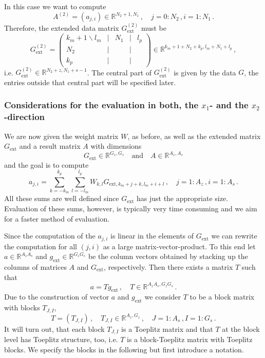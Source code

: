\documentclass[a4,12pt]{article}
\newcommand{\Real}[1]{\mathbb{R}^{#1}}
\begin{document}
In this case we want to compute
\[
A^{(2)}=(a_{j,i})\in\Real{N_2+1,N_1}\,,\quad j=0:N_2\,, i=1:N_1\,.
\]
Therefore, the extended data matrix $G_\text{ext}^{(2)}$ must be
\[
G_\text{ext}^{(2)}=
\begin{pmatrix}
k_m+1\backslash{}l_m&|&N_1&|& l_p\\\hline
N_2&|&&|&\\\hline
k_p&|&&|&
\end{pmatrix}
\in\Real{k_m+1+N_2+k_p,l_m+N_1+l_p}\,,
\]
i.e. $G_\text{ext}^{(2)}\in\Real{N_2+z,N_1+s-1}$.
The central part of $G_\text{ext}^{(2)}$ is given by the data $G$, the entries
outside that central part will be specified later.

\subsubsection*{Considerations for the evaluation in both, the $x_1$- and the 
  $x_2$-direction} 

We are now given the weight matrix $W$, as before, as well as the extended
matrix $G_\text{ext}$ and a result matrix $A$ with dimensions
\[
G_\text{ext}\in\Real{G_z,G_s}\quad\text{and}\quad
A\in\Real{A_z,A_s}
\]
and the goal is to compute
\[
a_{j,i}=\sum_{k=-k_m}^{k_p}\sum_{l=-l_m}^{l_p}W_{k,l}G_{\text{ext},k_m+j+k,l_m+i+l}\,,\quad
j=1:A_z\,, i=1:A_s\,.
\]
All these sums are well defined since $G_\text{ext}$ has just the appropriate
size. Evaluation of these sums, however, is typically very time consuming and we
aim for a faster method of evaluation.

Since the computation of the $a_{j,i}$ is linear in the elements of
$G_\text{ext}$ we can rewrite the computation for all $(j,i)$ as a large
matrix-vector-product. To this end let $a\in\Real{A_zA_s}$ and
$g_\text{ext}\in\Real{G_zG_s}$ be the column vectors obtained by stacking up the
columns of matrices $A$ and $G_\text{ext}$, respectively. Then there exists a
matrix $T$ such that
\[
a = T g_\text{ext}\,,\quad T\in\Real{A_zA_s, G_zG_s}\,.
\]
Due to the construction of vector $a$ and $g_\text{ext}$ we consider $T$ to be a
block matrix with blocks $T_{J,I}$,
\[
T= (T_{J,I})\,,\quad T_{J,I}\in\Real{A_z,G_z}\,,\quad J=1:A_s\,, I=1:G_s\,.
\]
It will turn out, that each block $T_{J,I}$ is a Toeplitz matrix and that $T$ at
the block level has Toeplitz structure, too, i.e. $T$ is a block-Toeplitz matrix
with Toeplitz blocks. We specify the blocks in the following but first introduce
a notation.
\end{document}
